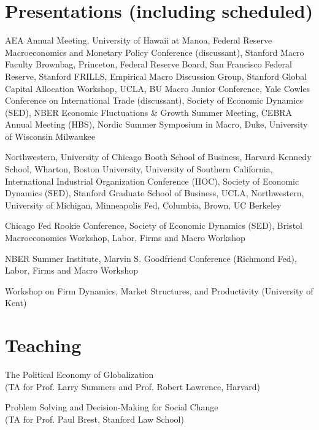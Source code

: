 \documentclass[letterpaper]{article}
\begin{document}
\section*{Presentations (including scheduled)}
\begin{description}[labelindent=0pt, labelwidth=1in, labelsep*=1em, leftmargin =!, font=\normalfont]
\item[2025] AEA Annual Meeting, University of Hawaii at Manoa, Federal Reserve Macroeconomics and Monetary Policy Conference (discussant), Stanford Macro Faculty Brownbag, Princeton, Federal Reserve Board, San Francisco Federal Reserve, Stanford FRILLS, Empirical Macro Discussion Group, Stanford Global Capital Allocation Workshop, UCLA, BU Macro Junior Conference, Yale Cowles Conference on International Trade (discussant), Society of Economic Dynamics (SED), NBER Economic Fluctuations \& Growth Summer Meeting, CEBRA Annual Meeting (HBS), Nordic Summer Symposium in Macro, Duke, University of Wisconsin Milwaukee
\item[2024] Northwestern, University of Chicago Booth School of Business, Harvard Kennedy School, Wharton, Boston University, University of Southern California, International Industrial Organization Conference (IIOC), Society of Economic Dynamics (SED), Stanford Graduate School of Business, UCLA, Northwestern, University of Michigan, Minneapolis Fed, Columbia, Brown, UC Berkeley %
\item[2023] Chicago Fed Rookie Conference, Society of Economic Dynamics (SED), Bristol Macroeconomics Workshop, Labor, Firms and Macro Workshop
\item[2022] NBER Summer Institute, Marvin S. Goodfriend Conference (Richmond Fed), Labor, Firms and Macro Workshop
\item[2021] Workshop on Firm Dynamics, Market Structures, and Productivity (University of Kent) 
\end{description}

\section*{Teaching}
\begin{description}[labelindent=0pt, labelwidth=1in, labelsep*=1em, leftmargin =!, font=\normalfont]
\item[2021] The Political Economy of Globalization\\ (TA for Prof. Larry Summers and Prof. Robert Lawrence, Harvard) 
\item[2015] Problem Solving and Decision-Making for Social Change\\ (TA for Prof. Paul Brest, Stanford Law School)
\end{description}
\end{document}
